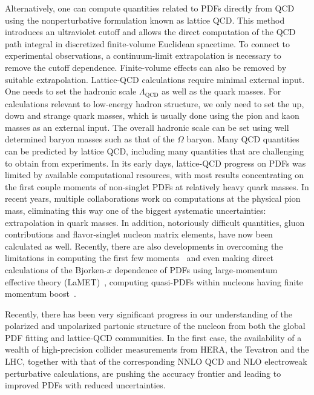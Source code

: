 Alternatively, one can compute quantities related to PDFs directly from QCD using the nonperturbative formulation known as lattice QCD.
This method introduces an ultraviolet cutoff and allows 
the direct computation of the QCD path integral in discretized 
  finite-volume Euclidean spacetime. To connect to experimental observations, a continuum-limit extrapolation is necessary to remove the cutoff dependence. Finite-volume effects can also be removed by suitable extrapolation.
%
Lattice-QCD calculations require minimal external input. One needs to set the hadronic scale $\Lambda_\text{QCD}$ as well as the quark masses. For calculations relevant to low-energy hadron structure, we only need to set the up, down and strange quark masses,
which is usually done using the pion and kaon masses as an external input. 
The overall hadronic scale can be set using well determined baryon masses such as that of the $\Omega$ baryon. 
Many QCD quantities can be predicted by lattice QCD, including many quantities that are challenging to obtain from experiments. 
In its early days, lattice-QCD progress on PDFs was limited by available computational resources,
with most results concentrating on the first couple moments of non-singlet PDFs at relatively heavy quark masses. 
In recent years, multiple collaborations work on computations  at the physical pion mass, eliminating this way one of the biggest systematic uncertainties: extrapolation in quark masses. In addition, notoriously difficult quantities, gluon contributions and flavor-singlet nucleon matrix elements, have now been calculated as well. Recently, there are also developments in overcoming the limitations in computing the first few moments~\cite{Constantinou:2014tga,Syritsyn:2014saa,Lin:2012ev} and even making direct calculations of the Bjorken-$x$ dependence of PDFs using large-momentum effective theory (LaMET)~\cite{Ji:2014gla}, computing quasi-PDFs within nucleons having finite momentum boost~\cite{Lin:2014zya,Alexandrou:2015rja,Chen:2016utp,Alexandrou:2016jqi}.

Recently, there has been very significant progress in our understanding
of the polarized and unpolarized partonic structure of the nucleon from both
the global PDF fitting and lattice-QCD communities.
%
In the first case, the availability of a wealth of high-precision collider measurements
from HERA, the Tevatron and the LHC, together with that of the corresponding
NNLO QCD and NLO electroweak perturbative calculations, are pushing the
accuracy frontier and leading to improved PDFs with reduced uncertainties.

